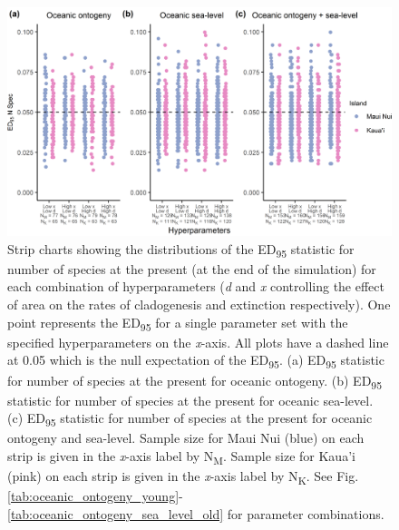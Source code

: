 \begin{figure}
    \centering
    \includegraphics{Hyperparameters_num_spec.png}
    \caption{Strip charts showing the distributions of the ED\textsubscript{95} statistic for number of species at the present (at the end of the simulation) for each combination of hyperparameters (\textit{d} and \textit{x} controlling the effect of area on the rates of cladogenesis and extinction respectively). One point represents the ED\textsubscript{95} for a single parameter set with the specified hyperparameters on the \textit{x}-axis. All plots have a dashed line at 0.05 which is the null expectation of the ED\textsubscript{95}. (a) ED\textsubscript{95} statistic for number of species at the present for oceanic ontogeny. (b) ED\textsubscript{95} statistic for number of species at the present for oceanic sea-level. (c) ED\textsubscript{95} statistic for number of species at the present for oceanic ontogeny and sea-level. Sample size for Maui Nui (blue) on each strip is given in the \textit{x}-axis label by N\textsubscript{M}. Sample size for Kaua'i (pink) on each strip is given in the \textit{x}-axis label by N\textsubscript{K}. See Fig. \ref{tab:oceanic_ontogeny_young}-\ref{tab:oceanic_ontogeny_sea_level_old} for parameter combinations.}
    \label{fig:Hyperparameters_num_spec}
\end{figure}

